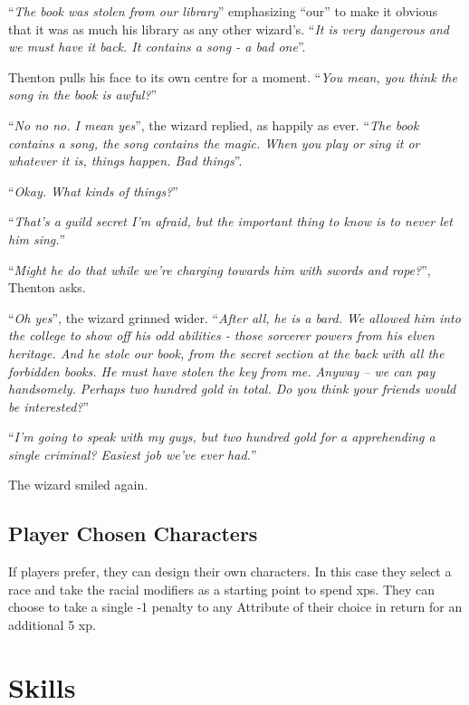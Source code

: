 \begin{multicols}{2}
{\begin{exampletext}
``\emph{The book was stolen from our library}'' emphasizing ``our'' to make it obvious that it was as much his library as any other wizard's.
``\emph{It is very dangerous and we must have it back.
It contains a song - a bad one}''.

Thenton pulls his face to its own centre for a moment. ``\emph{You mean, you think the song in the book is awful?}''

``\emph{No no no. I mean yes}'', the wizard replied, as happily as ever.
``\emph{The book contains a song, the song contains the magic.
When you play or sing it or whatever it is, things happen.
Bad things}''.

``\emph{Okay.
What kinds of things?}''

``\emph{That's a guild secret I'm afraid, but the important thing to know is to never let him sing.}''

``\emph{Might he do that while we're charging towards him with swords and rope?}'', Thenton asks.

``\emph{Oh yes}'', the wizard grinned wider.
``\emph{After all, he is a bard.
We allowed him into the college to show off his odd abilities - those sorcerer powers from his elven heritage.
And he stole our book, from the secret section at the back with all the forbidden books.
He must have stolen the key from me.
Anyway -- we can pay handsomely.
Perhaps two hundred gold in total.
Do you think your friends would be interested?}''

``\emph{I'm going to speak with my guys, but two hundred gold for a apprehending a single criminal? Easiest job we've ever had.}''

The wizard smiled again.

\end{exampletext}
}{}

\subsection{Player Chosen Characters}
\label{playerchosen}

If players prefer, they can design their own characters. In this case they select a race and take the racial modifiers as a starting point to spend \glspl{xp}.  They can choose to take a single -1 penalty to any Attribute of their choice in return for an additional 5 \gls{xp}.

\end{multicols}

\section{Skills}


